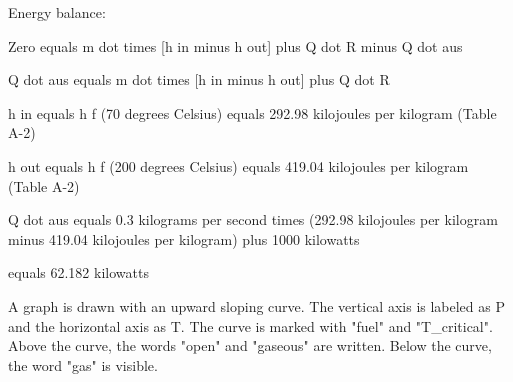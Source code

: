 Energy balance:

Zero equals m dot times [h in minus h out] plus Q dot R minus Q dot aus

Q dot aus equals m dot times [h in minus h out] plus Q dot R

h in equals h f (70 degrees Celsius) equals 292.98 kilojoules per kilogram (Table A-2)

h out equals h f (200 degrees Celsius) equals 419.04 kilojoules per kilogram (Table A-2)

Q dot aus equals 0.3 kilograms per second times (292.98 kilojoules per kilogram minus 419.04 kilojoules per kilogram) plus 1000 kilowatts

equals 62.182 kilowatts

A graph is drawn with an upward sloping curve. The vertical axis is labeled as P and the horizontal axis as T. The curve is marked with "fuel" and "T_critical". Above the curve, the words "open" and "gaseous" are written. Below the curve, the word "gas" is visible.